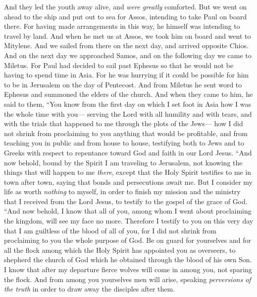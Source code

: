\begin{biblechapter}
\verse And they led the youth away alive, and \textit{were greatly} comforted.
 But we went on ahead to the ship and put out to sea for Assos, intending to take Paul on board there. For having made arrangements in this way, he himself was intending to travel by land.
\verse And when he met us at Assos, we took him on board and went to Mitylene.
\verse And we sailed from there on the next day, and arrived opposite Chios. And on the next day we approached Samos, and on the following day we came to Miletus.
\verse For Paul had decided to sail past Ephesus so that he would not be having to spend time in Asia. For he was hurrying if it could be possible for him to be in Jerusalem on the day of Pentecost.
 And from Miletus he sent word to Ephesus and summoned the elders of the church.
\verse And when they came to him, he said to them, “You know from the first day on which I set foot in Asia how I was the whole time with you—
\verse serving the Lord with all humility and with tears, and with the trials that happened to me through the plots of the Jews—
\verse how I did not shrink from proclaiming to you anything that would be profitable, and from teaching you in public and from house to house,
\verse testifying both to Jews and to Greeks with respect to repentance toward God and faith in our Lord Jesus.
\verse “And now behold, bound by the Spirit I am traveling to Jerusalem, not knowing the things that will happen to me \textit{there},
\verse except that the Holy Spirit testifies to me in town after town, saying that bonds and persecutions await me.
\verse But I consider my life as worth \textit{nothing} to myself, in order to finish my mission and the ministry that I received from the Lord Jesus, to testify to the gospel of the grace of God.
\verse “And now behold, I know that all of you, among whom I went about proclaiming the kingdom, will see my face no more.
\verse Therefore I testify to you on this very day that I am guiltless of the blood of all of you,
\verse for I did not shrink from proclaiming to you the whole purpose of God.
\verse Be on guard for yourselves and for all the flock among which the Holy Spirit has appointed you as overseers, to shepherd the church of God which he obtained through the blood of his own Son.
\verse I know that after my departure fierce wolves will come in among you, not sparing the flock.
\verse And from among you yourselves men will arise, speaking \textit{perversions of the truth} in order to draw away the disciples after them.

\end{biblechapter}
